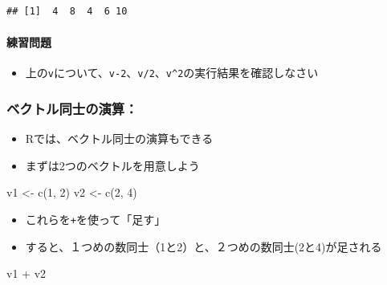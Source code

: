 \documentclass[
]{book}
\newenvironment{Shaded}{\begin{snugshade}}{\end{snugshade}}
\newcommand{\DecValTok}[1]{\textcolor[rgb]{0.00,0.00,0.81}{#1}}
\newcommand{\FunctionTok}[1]{\textcolor[rgb]{0.00,0.00,0.00}{#1}}
\newcommand{\NormalTok}[1]{#1}
\newcommand{\OtherTok}[1]{\textcolor[rgb]{0.56,0.35,0.01}{#1}}
\newcommand{\SpecialCharTok}[1]{\textcolor[rgb]{0.00,0.00,0.00}{#1}}
\providecommand{\tightlist}{%
  \setlength{\itemsep}{0pt}\setlength{\parskip}{0pt}}
\begin{document}
\begin{verbatim}
## [1]  4  8  4  6 10
\end{verbatim}

\hypertarget{ux7df4ux7fd2ux554fux984c-2}{%
\paragraph*{練習問題}\label{ux7df4ux7fd2ux554fux984c-2}}

\begin{itemize}
\tightlist
\item
  上の\texttt{v}について、\texttt{v-2}、\texttt{v/2}、\texttt{v\^{}2}の実行結果を確認しなさい
\end{itemize}

\hypertarget{ux30d9ux30afux30c8ux30ebux540cux58ebux306eux6f14ux7b97}{%
\subsubsection*{ベクトル同士の演算：}\label{ux30d9ux30afux30c8ux30ebux540cux58ebux306eux6f14ux7b97}}

\begin{itemize}
\tightlist
\item
  Rでは、ベクトル同士の演算もできる
\item
  まずは2つのベクトルを用意しよう
\end{itemize}

\begin{Shaded}
\begin{Highlighting}[]
\NormalTok{v1 }\OtherTok{\textless{}{-}} \FunctionTok{c}\NormalTok{(}\DecValTok{1}\NormalTok{, }\DecValTok{2}\NormalTok{) }
\NormalTok{v2 }\OtherTok{\textless{}{-}} \FunctionTok{c}\NormalTok{(}\DecValTok{2}\NormalTok{, }\DecValTok{4}\NormalTok{) }
\end{Highlighting}
\end{Shaded}

\begin{itemize}
\tightlist
\item
  これらを\texttt{+}を使って「足す」
\item
  すると、１つめの数同士（1と2）と、２つめの数同士(2と4)が足される
\end{itemize}

\begin{Shaded}
\begin{Highlighting}[]
\NormalTok{v1 }\SpecialCharTok{+}\NormalTok{ v2}
\end{Highlighting}
\end{Shaded}
\end{document}
